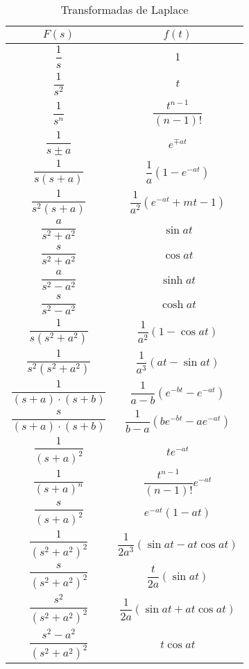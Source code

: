 \begin{table}[h]
    \centering
   \resizebox{7.2cm}{!} {
\begin{tabular}{|c|c|}
\hline                          
$F(s)	$&$	f(t) $ \\ \hline
$\dfrac 1{s}	$ &	 $1$ \\ \hline
$\dfrac 1{s^2}	$& $	t$ \\ \hline
$\dfrac 1{s^n}	$& $	\dfrac {t^{n-1}}{(n-1)!}$ \\ \hline
$\dfrac 1{s \pm a}	$& $	e^{\mp at}$ \\ \hline
$\dfrac 1{s(s + a)}	$& $	\dfrac 1a(1-e^{-at})$ \\ \hline
$\dfrac 1{s^2(s + a)}	$& $	\dfrac 1{a^2}(e^{-at}+mt-1)$ \\ \hline
$\dfrac a{s^2 + a^2}	$& $	\sin at$ \\ \hline
$\dfrac s{s^2 + a^2}	$& $	\cos at$ \\ \hline
$\dfrac a{s^2 - a^2}	$& $	\sinh at$ \\ \hline
$\dfrac s{s^2 - a^2}	$& $	\cosh at$ \\ \hline
$\dfrac 1{s(s^2 + a^2)}	$& $	\dfrac 1{a^2}(1-\cos at)$ \\ \hline
$\dfrac 1{s^2(s^2 + a^2)}	$& $	\dfrac 1{a^3}(at-\sin at)$ \\ \hline
$\dfrac 1{(s+a) \cdot (s+b)}	$& $	\dfrac 1{a-b}(e^{-bt}-e^{-at})$ \\ \hline
$\dfrac s{(s+a) \cdot (s+b)}$&	 $	\dfrac 1{b-a}(be^{-bt}-ae^{-at})$ \\ \hline
$\dfrac 1{(s + a)^2}	$& $	te^{- at}$ \\ \hline
$\dfrac 1{(s + a)^n}	$& $	\dfrac {t^{n-1}}{(n-1)!}e^{- at}$ \\ \hline
$\dfrac s{(s + a)^2}	$& $	e^{- at}(1-at)$ \\ \hline
$\dfrac 1{(s^2 + a^2)^2}	$& $	\dfrac 1{2a^3}(\sin at -at \cos at)$ \\ \hline
$\dfrac s{(s^2 + a^2)^2}	$& $	\dfrac t{2a}(\sin at )$ \\ \hline
$\dfrac {s^2}{(s^2 + a^2)^2}	$& $	\dfrac 1{2a}(\sin at +at \cos at)$ \\ \hline
$\dfrac {s^2-a^2}{(s^2 + a^2)^2}	$& $	t \cos at$ \\ \hline
                          
\end{tabular}
}

    \caption{Transformadas de Laplace}
    \label{tab:transfor-laplace}
\end{table}
